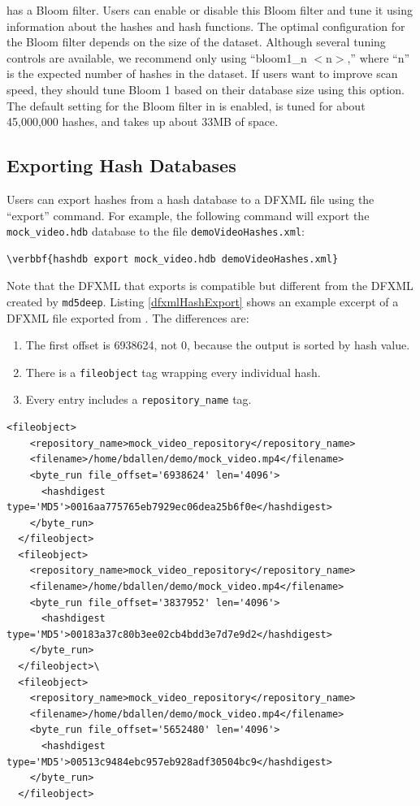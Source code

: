 \documentclass[11pt,fleqn]{article} %
\begin{document}
\hash has a Bloom filter.  Users can enable or disable this Bloom filter and tune it using information about the hashes and hash functions. The optimal configuration for the Bloom filter depends on the size of the dataset. Although several tuning controls are available, we recommend only using ``bloom1\_n $<$n$>$,'' where ``n'' is the expected number of hashes in the dataset. If users want to improve scan speed, they should tune Bloom 1 based on their database size using this option. The default setting for the Bloom filter in \hash is enabled, is tuned for about 45,000,000 hashes, and takes up about 33MB of space. 

\subsection{Exporting Hash Databases}
Users can export hashes from a hash database to a DFXML file using the ``export'' command. For example, the following command will export the \texttt{mock\_video.hdb} database to the file \texttt{demoVideoHashes.xml}:
\begin{Verbatim}[commandchars=\\\{\}]
\verbbf{hashdb export mock_video.hdb demoVideoHashes.xml}
\end{Verbatim}

Note that the DFXML that \hash exports is compatible but different from the DFXML created by \texttt{md5deep}. Listing \ref{dfxmlHashExport} shows an example excerpt of a DFXML file exported from \hash. The differences are:
\begin{enumerate}
\item The first offset is 6938624, not 0,
because the output is sorted by hash value. 
\item There is a \texttt{fileobject} tag wrapping every individual hash.
\item Every entry includes a \texttt{repository\_name} tag.
\end{enumerate}

\lstset{style=customfile}
\begin{lstlisting}[float, caption=Excerpt of a DFXML exported by \hash, label=dfxmlHashExport]
  <fileobject>
    <repository_name>mock_video_repository</repository_name>
    <filename>/home/bdallen/demo/mock_video.mp4</filename>
    <byte_run file_offset='6938624' len='4096'>
      <hashdigest type='MD5'>0016aa775765eb7929ec06dea25b6f0e</hashdigest>
    </byte_run>
  </fileobject>
  <fileobject>
    <repository_name>mock_video_repository</repository_name>
    <filename>/home/bdallen/demo/mock_video.mp4</filename>
    <byte_run file_offset='3837952' len='4096'>
      <hashdigest type='MD5'>00183a37c80b3ee02cb4bdd3e7d7e9d2</hashdigest>
    </byte_run>
  </fileobject>\
  <fileobject>
    <repository_name>mock_video_repository</repository_name>
    <filename>/home/bdallen/demo/mock_video.mp4</filename>
    <byte_run file_offset='5652480' len='4096'>
      <hashdigest type='MD5'>00513c9484ebc957eb928adf30504bc9</hashdigest>
    </byte_run>
  </fileobject>
\end{lstlisting}
\end{document}
